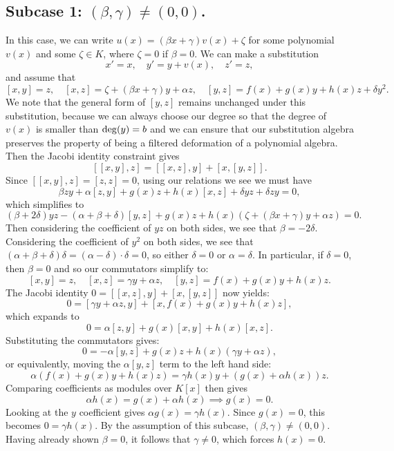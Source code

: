 \documentclass[a4paper,11pt,twoside,notitlepage,reqno]{amsart}
\theoremstyle{plain}
\numberwithin{thm}{section}
\theoremstyle{definition}
\begin{document}
\subsection{Subcase 1: $(\beta,\gamma)\neq (0,0)$.}
In this case, we can write $u(x) = (\beta x + \gamma) v(x) + \zeta$ for some polynomial $v(x)$ and some $\zeta\in K$, where $\zeta=0$ if $\beta=0$. We can make a substitution 
$$x' = x, \quad y' = y+v(x), \quad z' = z,$$ 
and assume that
$$[x,y]=z, \quad [x,z] = \zeta + (\beta x+\gamma) y + \alpha z, \quad [y,z] = f(x) + g(x) y+h(x)z+\delta y^2.$$
We note that the general form of $[y,z]$ remains unchanged under this substitution, because we can always choose our degree so that the degree of $v(x)$ is smaller than ${\rm deg}(y)=b$ and we can ensure that our substitution algebra preserves the property of being a filtered deformation of a polynomial algebra.
Then the Jacobi identity constraint gives
$$[[x,y],z] = [[x,z],y]+[x,[y,z]].$$
Since $[[x,y],z] = [z,z] = 0$, using our relations we see we must have
$$\beta zy + \alpha [z,y] + g(x) z + h(x) [x,z] + \delta yz + \delta zy = 0,$$
which simplifies to
\begin{equation}
\label{eq:bdg}
(\beta+2\delta) yz - (\alpha +\beta+\delta) [y,z] + g(x) z + h(x)(\zeta + (\beta x + \gamma)y + \alpha z) = 0.
\end{equation}
Then considering the coefficient of $yz$ on both sides, we see that $\beta=-2\delta$. 
Considering the coefficient of $y^2$ on both sides, we see that $(\alpha+\beta+\delta) \delta=(\alpha-\delta)\cdot \delta=0$, so either $\delta=0$ or $\alpha=\delta$.  
In particular, if $\delta=0$, then $\beta=0$ and so our commutators simplify to:
$$[x,y]=z, \quad [x,z] = \gamma y +\alpha z, \quad [y,z]=f(x)+g(x)y + h(x) z.$$
The Jacobi identity $0 = [[x,z],y] + [x,[y,z]]$ now yields:
$$0 = [\gamma y + \alpha z, y] + [x, f(x) + g(x)y + h(x)z],$$
which expands to
$$0 = \alpha [z,y] + g(x)[x,y] + h(x)[x,z].$$
Substituting the commutators gives:
$$0 = -\alpha [y,z] + g(x)z + h(x)(\gamma y + \alpha z),$$
or equivalently, moving the $\alpha[y,z]$ term to the left hand side:
$$\alpha (f(x) + g(x)y + h(x)z) = \gamma h(x)y + (g(x) + \alpha h(x))z.$$
Comparing coefficients as modules over $K[x]$ then gives
$$\alpha h(x) = g(x) + \alpha h(x) \implies g(x) = 0.$$
Looking at the $y$ coefficient gives $\alpha g(x) = \gamma h(x)$. Since $g(x) = 0$, this becomes $0 = \gamma h(x)$. By the assumption of this subcase, $(\beta,\gamma)\neq (0,0)$. Having already shown $\beta=0$, it follows that $\gamma \neq 0$, which forces $h(x)=0$. 
\end{document}
